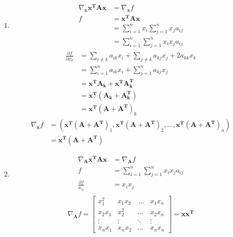 \documentclass[solution,addpoints,12pt]{exam}
\begin{document}
\begin{questions}
\begin{parts}
\begin{solution}
\begin{enumerate}
          		\item
          			\begin{align*}
          				\nabla_{\mathbf{x}} \boldsymbol{x^TAx} &= \nabla_{\mathbf{x}} f\\
						f &= \boldsymbol{x^TAx}\\          				
          				  &= \sum_{i=1}^{n} x_i \sum_{j=1}^{n} x_j a_{ij}\\
          					&= \sum_{i=1}^{n} \sum_{j=1}^{n} x_i x_j a_{ij}
          			\end{align*}
          			\begin{align*}
          				\frac{\partial f}{\partial x_k} &= \sum_{i \neq k} a_{ik} x_i + \sum_{j \neq k} a_{kj} x_j + 2a_{kk}x_k\\
          				&= \sum_{i=1}^{n} a_{ik}x_i + \sum_{j=1}^{n} a_{kj}x_j\\
          				&= \boldsymbol{x^TA_k} + \boldsymbol{x^TA_k^T}\\
          				&= \boldsymbol{x^T} \left(\boldsymbol{A_k} + \boldsymbol{A^T_k} \right)\\
          				&= \boldsymbol{x^T} \left(\boldsymbol{A}+ \boldsymbol{A^T} \right)_k
          			\end{align*}
          			\begin{align*}
          				\nabla_{\mathbf{x}} f &= \left(\boldsymbol{x^T} \left(\boldsymbol{A} + \boldsymbol{A^T}\right)_1, \boldsymbol{x^T} \left(\boldsymbol{A} + \boldsymbol{A^T}\right)_2, \dots, \boldsymbol{x^T} \left(\boldsymbol{A} + \boldsymbol{A^T}\right)_n \right)\\
          				&= \boldsymbol{x^T} \left(\boldsymbol{A} + \boldsymbol{A^T} \right)
          			\end{align*}
          			
          		\item
          			\begin{align*}
          				\nabla_{\mathbf{A}} \boldsymbol{x^TAx} &= \nabla_{\mathbf{A}} f\\
          				f &= \sum_{i=1}^{n} \sum_{j=1}^{n} x_ix_ja_{ij}\\
          				\frac{\partial f}{a_{ij}} &= x_i x_j\\
          			\end{align*}
\[          				\nabla_{\mathbf{A}} f = 
					\begin{bmatrix}  									
							x_1^2 & x_1x_2 &\ \dots & x_1x_n\\
          					x_2x_1 & x_2^2 & \dots & x_2x_n\\
          					\vdots & \vdots & \ddots & \vdots\\
          					x_nx_1 & x_nx_2 & \dots & x_nx_n
          			\end{bmatrix} = \boldsymbol{xx^T}
\]


\end{enumerate}
\end{solution}
\end{parts}
\end{questions}
\end{document}
